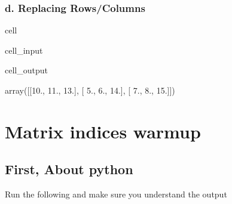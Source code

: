 \documentclass[letterpaper,10pt,english]{jupyterBook}
\begin{document}
\subsection{d. Replacing Rows/Columns}
\label{\detokenize{lessons/Intro_to_Matrices_in_NumPy:d-replacing-rows-columns}}
\begin{sphinxuseclass}{cell}\begin{sphinxVerbatimInput}

\begin{sphinxuseclass}{cell_input}
\begin{sphinxVerbatim}[commandchars=\\\{\}]
\PYG{p}{[} \PYG{p}{]}  \PYG{p}{[}  \PYG{p}{]}

\PYG{p}{[} \PYG{p}{]}  \PYG{p}{[}  \PYG{p}{]}

\end{sphinxVerbatim}

\end{sphinxuseclass}\end{sphinxVerbatimInput}
\begin{sphinxVerbatimOutput}

\begin{sphinxuseclass}{cell_output}
\begin{sphinxVerbatim}[commandchars=\\\{\}]
array([[10., 11., 13.],
       [ 5.,  6., 14.],
       [ 7.,  8., 15.]])
\end{sphinxVerbatim}

\end{sphinxuseclass}\end{sphinxVerbatimOutput}

\end{sphinxuseclass}
\sphinxstepscope


\chapter{Matrix indices warmup}
\label{\detokenize{lessons/Matrices_Index_Warmup-Student:matrix-indices-warmup}}\label{\detokenize{lessons/Matrices_Index_Warmup-Student::doc}}

\section{First, About python }
\label{\detokenize{lessons/Matrices_Index_Warmup-Student:first-about-python-range-a-b}}
\sphinxAtStartPar
Run the following and make sure you understand the output
\end{document}
